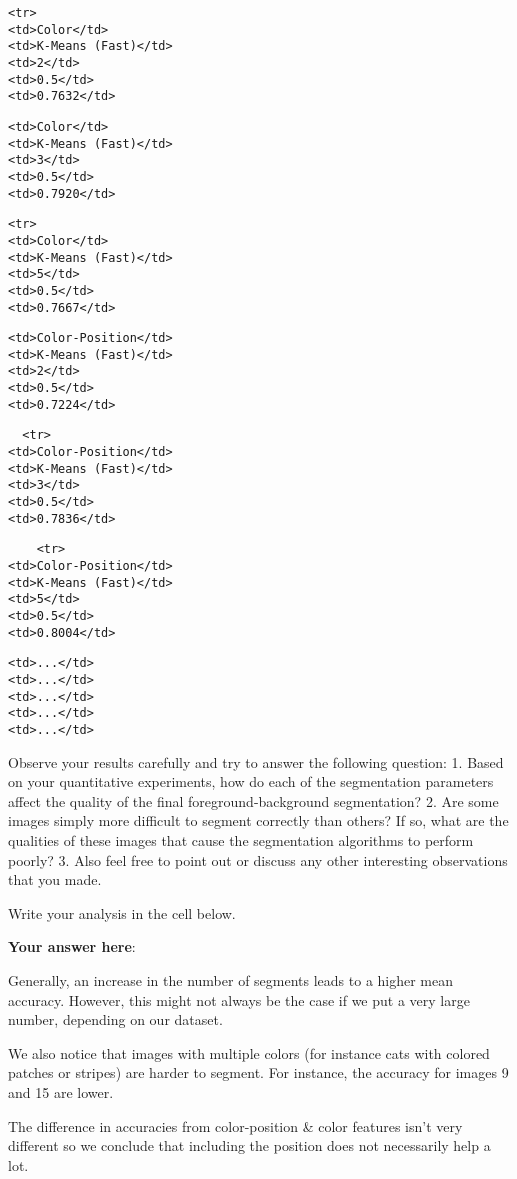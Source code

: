 \documentclass[11pt]{article}
\begin{document}
\begin{verbatim}
<tr>
<td>Color</td>
<td>K-Means (Fast)</td>
<td>2</td>
<td>0.5</td>
<td>0.7632</td>
\end{verbatim}

\begin{verbatim}
<td>Color</td>
<td>K-Means (Fast)</td>
<td>3</td>
<td>0.5</td>
<td>0.7920</td>
\end{verbatim}

\begin{verbatim}
<tr>
<td>Color</td>
<td>K-Means (Fast)</td>
<td>5</td>
<td>0.5</td>
<td>0.7667</td>
\end{verbatim}

\begin{verbatim}
<td>Color-Position</td>
<td>K-Means (Fast)</td>
<td>2</td>
<td>0.5</td>
<td>0.7224</td>
\end{verbatim}

\begin{verbatim}
  <tr>
<td>Color-Position</td>
<td>K-Means (Fast)</td>
<td>3</td>
<td>0.5</td>
<td>0.7836</td>
\end{verbatim}

\begin{verbatim}
    <tr>
<td>Color-Position</td>
<td>K-Means (Fast)</td>
<td>5</td>
<td>0.5</td>
<td>0.8004</td>
\end{verbatim}

\begin{verbatim}
<td>...</td>
<td>...</td>
<td>...</td>
<td>...</td>
<td>...</td>
\end{verbatim}

    Observe your results carefully and try to answer the following question:
1. Based on your quantitative experiments, how do each of the
segmentation parameters affect the quality of the final
foreground-background segmentation? 2. Are some images simply more
difficult to segment correctly than others? If so, what are the
qualities of these images that cause the segmentation algorithms to
perform poorly? 3. Also feel free to point out or discuss any other
interesting observations that you made.

Write your analysis in the cell below.

    \textbf{Your answer here}:

Generally, an increase in the number of segments leads to a higher mean
accuracy. However, this might not always be the case if we put a very
large number, depending on our dataset.

We also notice that images with multiple colors (for instance cats with
colored patches or stripes) are harder to segment. For instance, the
accuracy for images 9 and 15 are lower.

The difference in accuracies from color-position \& color features isn't
very different so we conclude that including the position does not
necessarily help a lot.


    
    
    
    
\end{document}
